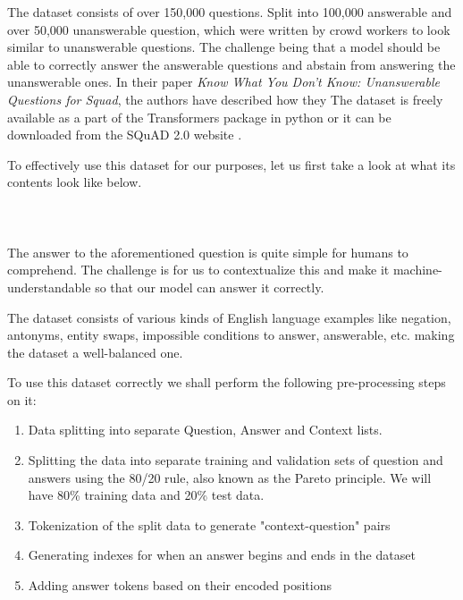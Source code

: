 \documentclass[11pt]{article}
\begin{document}
	The dataset consists of over 150,000 questions. Split into 100,000 answerable and over 50,000 unanswerable question, which were written by crowd workers to look similar to unanswerable questions. The challenge being that a model should be able to correctly answer the answerable questions and abstain from answering the unanswerable ones. In their paper \textit{Know What You Don't Know: Unanswerable Questions for Squad}, \cite{dataset} the authors have described how they
	The dataset is freely available as a part of the Transformers package in python or it can be downloaded from the SQuAD 2.0 website \citep{squad}.

	To effectively use this dataset for our purposes, let us first take a look at what its contents look like below.\\ \\
	\noindent{}
	\\ \\

	The answer to the aforementioned question is quite simple for humans to comprehend. The challenge is for us to contextualize this and make it machine-understandable so that our model can answer it correctly.

	The dataset consists of various kinds of English language examples like negation, antonyms, entity swaps, impossible conditions to answer, answerable, etc. making the dataset a well-balanced one.

	To use this dataset correctly we shall perform the following pre-processing steps on it:

	\begin{enumerate}
		\item Data splitting into separate Question, Answer and Context lists.
		\item Splitting the data into separate training and validation sets of  question and answers using the 80/20 rule, also known as the Pareto principle. We will have 80\% training data and 20\% test data.
		\item Tokenization of the split data to generate "context-question" pairs
		\item Generating indexes for when an answer begins and ends in the dataset
		\item Adding answer tokens based on their encoded positions
	\end{enumerate}
\end{document}
